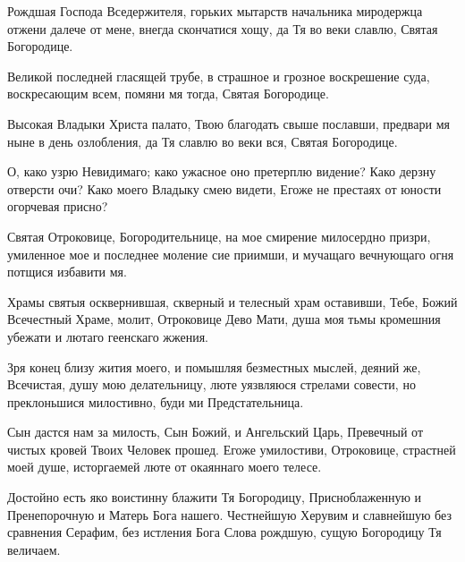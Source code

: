 \begin{mymulticols}

Рождшая Господа Вседержителя, горьких мытарств начальника миродержца отжени далече от мене, внегда скончатися хощу, да Тя во веки славлю, Святая Богородице. 

\slavan

Великой последней гласящей трубе, в страшное и грозное воскрешение суда, воскресающим всем, помяни мя тогда, Святая Богородице. 

\inynen

 Высокая Владыки Христа палато, Твою благодать свыше пославши, предвари мя ныне в день озлобления, да Тя славлю во веки вся, Святая Богородице.




О, како узрю Невидимаго; како ужасное оно претерплю видение? Како дерзну отверсти очи? Како моего Владыку смею видети, Егоже не престаях от юности огорчевая присно? 


Святая Отроковице, Богородительнице, на мое смирение милосердно призри, умиленное мое и последнее моление сие приимши, и мучащаго вечнующаго огня потщися избавити мя. 


Храмы святыя осквернившая, скверный и телесный храм оставивши, Тебе, Божий Всечестный Храме, молит, Отроковице Дево Мати, душа моя тьмы кромешния убежати и лютаго геенскаго жжения. 

\slavan

Зря конец близу жития моего, и помышляя безместных мыслей, деяний же, Всечистая, душу мою делательницу, люте уязвляюся стрелами совести, но преклоньшися милостивно, буди ми Предстательница. 

\inynen

 Сын дастся нам за милость, Сын Божий, и Ангельский Царь, Превечный от чистых кровей Твоих Человек прошед. Егоже умилостиви, Отроковице, страстней моей душе, исторгаемей люте от окаяннаго моего телесе. 

 Достойно есть яко воистинну блажити Тя Богородицу, Присноблаженную и Пренепорочную и Матерь Бога нашего. Честнейшую Херувим и славнейшую без сравнения Серафим, без истления Бога Слова рождшую, сущую Богородицу Тя величаем.


\end{mymulticols}
